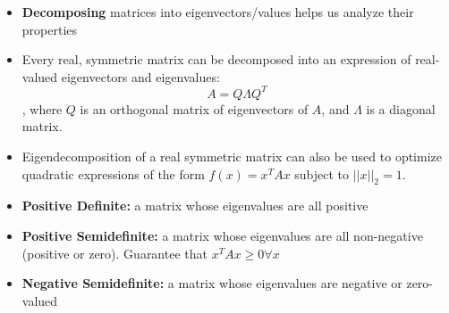 \begin{itemize}
    \item \textbf{Decomposing} matrices into eigenvectors/values helps us analyze their properties
    \item Every real, symmetric matrix can be decomposed into an expression of real-valued eigenvectors and eigenvalues:
    $$ A = Q \Lambda Q^T$$,
    where $Q$ is an orthogonal matrix of eigenvectors of $A$, and $\Lambda$ is a diagonal matrix.
    \item Eigendecomposition of a real symmetric matrix can also be used to optimize quadratic expressions of the form $f(x) = x^T Ax $ subject to $||x||_2 = 1$.
    \item \textbf{Positive Definite:} a matrix whose eigenvalues are all positive
    \item \textbf{Positive Semidefinite:} a matrix whose eigenvalues are all non-negative (positive or zero). Guarantee that $x^T Ax \geq 0 \forall x$
    \item \textbf{Negative Semidefinite:} a matrix whose eigenvalues are negative or zero-valued
\end{itemize}


